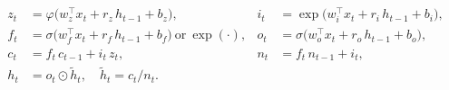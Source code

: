 %

\begin{align}
  z_t &= \varphi\!\big(w_z^\top x_t + r_z\,h_{t-1} + b_z\big), &
  i_t &= \exp\!\big(w_i^\top x_t + r_i\,h_{t-1} + b_i\big), \label{eq:slstm-zi}\\
  f_t &= \sigma\!\big(w_f^\top x_t + r_f\,h_{t-1} + b_f\big)\ \text{or}\ \exp(\cdot), &
  o_t &= \sigma\!\big(w_o^\top x_t + r_o\,h_{t-1} + b_o\big), \label{eq:slstm-fo}\\
  c_t &= f_t\,c_{t-1} + i_t\,z_t, &
  n_t &= f_t\,n_{t-1} + i_t, \label{eq:slstm-cn}\\
  h_t &= o_t\odot\tilde{h}_t,\quad \tilde{h}_t = c_t/n_t. &&  \label{eq:slstm-h}
\end{align}




